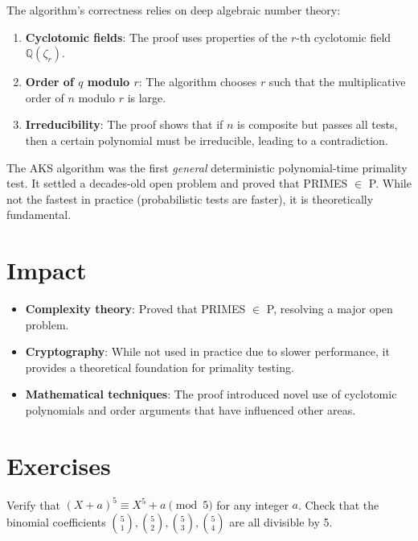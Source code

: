 The algorithm's correctness relies on deep algebraic number theory:

\begin{enumerate}
\item \textbf{Cyclotomic fields}: The proof uses properties of the $r$-th cyclotomic field $\mathbb{Q}(\zeta_r)$.
\item \textbf{Order of $q$ modulo $r$}: The algorithm chooses $r$ such that the multiplicative order of $n$ modulo $r$ is large.
\item \textbf{Irreducibility}: The proof shows that if $n$ is composite but passes all tests, then a certain polynomial must be irreducible, leading to a contradiction.
\end{enumerate}

\begin{highlightbox}
The AKS algorithm was the first \emph{general} deterministic polynomial-time primality test. It settled a decades-old open problem and proved that PRIMES $\in$ P. While not the fastest in practice (probabilistic tests are faster), it is theoretically fundamental.
\end{highlightbox}

\section{Impact}

\begin{itemize}
\item \textbf{Complexity theory}: Proved that PRIMES $\in$ P, resolving a major open problem.
\item \textbf{Cryptography}: While not used in practice due to slower performance, it provides a theoretical foundation for primality testing.
\item \textbf{Mathematical techniques}: The proof introduced novel use of cyclotomic polynomials and order arguments that have influenced other areas.
\end{itemize}

\section{Exercises}

\begin{exercise}[Basic]
Verify that $(X + a)^5 \equiv X^5 + a \pmod{5}$ for any integer $a$. Check that the binomial coefficients $\binom{5}{1}, \binom{5}{2}, \binom{5}{3}, \binom{5}{4}$ are all divisible by 5.
\end{exercise}

